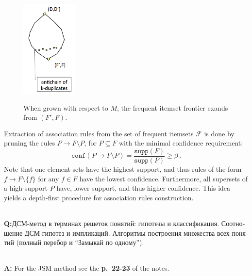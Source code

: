 \documentclass[a4paper,14pt]{extarticle}
\newcommand{\Fcal}{\mathcal{F}}
\newcommand{\rus}[1]{\foreignlanguage{russian}{#1}}
\begin{document}
\begin{figure}
    \centering
    \includegraphics[width=0.25\textwidth]{assoc_rules_sublattice.png}
    \label{fig:assoc_rules_lattice}
    \caption{When grown with respect to $M$, the frequent itemset frontier
    exands from $(F', F)$.}
\end{figure}

Extraction of association rules from the set of frequent itemsets $\Fcal$ is done by
pruning the rules $P\to F\setminus P$, for $P\subseteq F$ with the minimal confidence
requirement:
$$ \mathtt{conf}(P \to F\setminus P)
    = \frac{\mathtt{supp}(F)}{\mathtt{supp}(P)} \geq \beta
    \,. $$
Note that one-element sets have the highest support, and thus rules of the form 
$f\to F\setminus \{f\}$ for any $f\in F$ have the lowest confidence. Furthermore,
all supersets of a high-support $P$ have, lower support, and thus higher confidence.
This idea yields a depth-first procedure for association rules construction.

\hfill\\\textbf{Q:}\rus{ДСМ-метод в терминах решеток понятий: гипотезы и классификация.
Соотношение ДСМ-гипотез и импликаций. Алгоритмы построения множества всех понятий (полный
перебор и ``Замыкай по одному'').}

\hfill\\\textbf{A:}
\noindent For the JSM method see the \textbf{p.~22-23} of the notes.
\end{document}
